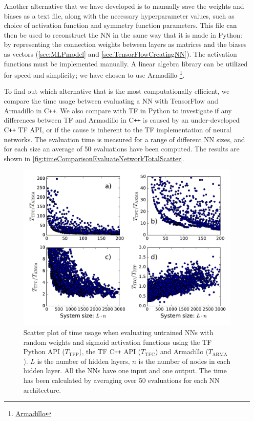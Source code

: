 \documentclass[twoside,english]{uiofysmaster}
\begin{document}
Another alternative that we have developed is to manually save the weights and biases
as a text file, along with the necessary hyperparameter values, such as choice of activation function and 
symmetry function parameters. This file 
can then be used to reconstruct the NN in the same way that it is made in Python: by representing
the connection weights between layers as matrices and the biases as vectors 
(\autoref{sec:MLPmodel} and \autoref{sec:TensorFlowCreatingNN}). 
The activation functions must be implemented manually. A linear algebra library can
be utilized for speed and simplicity; we have chosen to use Armadillo%
\footnote{\href{http://arma.sourceforge.net/}{Armadillo}}. 

To find out which alternative that is the most computationally efficient, we compare the 
time usage between evaluating a NN with TensorFlow and Armadillo in C\texttt{++}. We also compare with TF in Python to 
investigate if any differences between TF and Armadillo in C\texttt{++} is caused by an under-developed C\texttt{++} TF API, or 
if the cause is inherent to the TF implementation of neural networks.
The evaluation time 
is measured for a range of different NN sizes, and for each size an average of 50 evaluations have been computed.
The results are shown in \autoref{fig:timeComparisonEvaluateNetworkTotalScatter}.
\begin{figure}[t]
\centering
  \includegraphics[width = 0.9\linewidth]{Figures/Tests/timeComparisonNetworkNew.pdf}
  \caption{Scatter plot of time usage when evaluating untrained NNs with random weights and sigmoid activation functions
	   using the TF Python API ($T_{\mathrm{TFP}}$), the TF C\texttt{++} API ($T_{\mathrm{TFC}}$) and Armadillo ($T_{\mathrm{ARMA}}$). 
	   $L$ is the number of hidden layers, $n$ is the number of nodes in each hidden layer. All the NNs
	   have one input and one output. The time has been calculated by averaging over 50 evaluations
	   for each NN architecture.}
\label{fig:timeComparisonEvaluateNetworkTotalScatter}
\end{figure}
\end{document}
